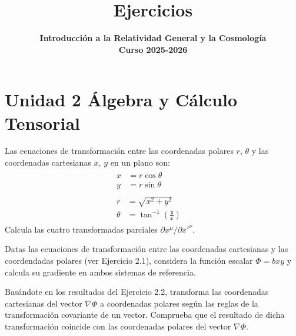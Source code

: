 \documentclass[12pt]{article}
\newenvironment{exercise}[2][Ejercicio]{\begin{trivlist} 
\item[\hskip \labelsep {\bfseries #1}\hskip \labelsep {\bfseries #2.}]}{\end{trivlist}}
\begin{document}
 
 
\title{\textbf{Ejercicios}}
\author{\textbf{Introducción a la Relatividad General y la Cosmología}\\
\textbf{Curso 2025-2026}}\date{} 
\maketitle

\section*{Unidad 2 Álgebra y Cálculo Tensorial}

\begin{exercise}{2.1} 
Las ecuaciones de transformación entre las coordenadas polares $r$, $\theta$ y las coordenadas cartesianas $x$, $y$ en un plano son:
\begin{gather}
\begin{aligned}
x &= r\cos\theta\\
y &= r\sin\theta
\end{aligned}
\quad \text{}
\tag{1}
\\[6pt]
\begin{aligned}
r &= \sqrt{x^{2}+y^{2}}\\
\theta &= \tan^{-1}\!\left(\frac{y}{x}\right)
\end{aligned}
\quad \text{}
\tag{2}
\end{gather}
Calcula las cuatro transformadas parciales $\partial{x^{\mu}}/\partial{x'^{\nu}}$. 
\end{exercise}

\begin{exercise}{2.2} 
Datas las ecuaciones de transformación entre las coordenadas cartesianas y las coordendadas polares (ver Ejercicio 2.1), considera la función escalar $\Phi = bxy$ y calcula su gradiente en ambos sistemas de referencia.
\end{exercise}

\begin{exercise}{2.3}
Basándote en los resultados del Ejercicio 2.2, transforma las coordenadas cartesianas del vector $\nabla \Phi$ a coordenadas polares según las reglas de la transformación covariante de un vector. Comprueba que el resultado de dicha transformación coincide con las coordenadas polares del vector $\nabla \Phi$.
\end{exercise}
\end{document}

